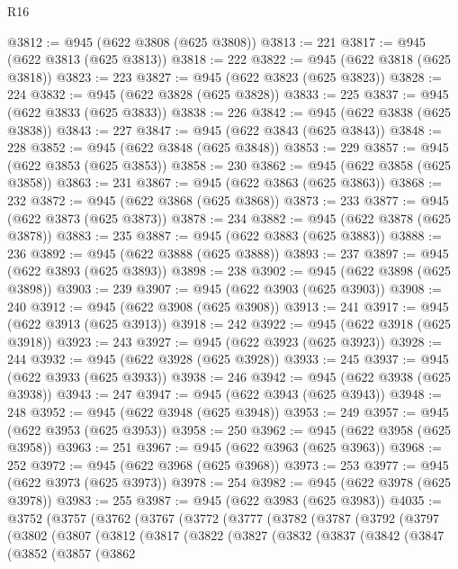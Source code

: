\begin{lexlean}{R16}
\begin{coremodule}
@3812 := @945 (@622 @3808 (@625 @3808))
@3813 := 221
@3817 := @945 (@622 @3813 (@625 @3813))
@3818 := 222
@3822 := @945 (@622 @3818 (@625 @3818))
@3823 := 223
@3827 := @945 (@622 @3823 (@625 @3823))
@3828 := 224
@3832 := @945 (@622 @3828 (@625 @3828))
@3833 := 225
@3837 := @945 (@622 @3833 (@625 @3833))
@3838 := 226
@3842 := @945 (@622 @3838 (@625 @3838))
@3843 := 227
@3847 := @945 (@622 @3843 (@625 @3843))
@3848 := 228
@3852 := @945 (@622 @3848 (@625 @3848))
@3853 := 229
@3857 := @945 (@622 @3853 (@625 @3853))
@3858 := 230
@3862 := @945 (@622 @3858 (@625 @3858))
@3863 := 231
@3867 := @945 (@622 @3863 (@625 @3863))
@3868 := 232
@3872 := @945 (@622 @3868 (@625 @3868))
@3873 := 233
@3877 := @945 (@622 @3873 (@625 @3873))
@3878 := 234
@3882 := @945 (@622 @3878 (@625 @3878))
@3883 := 235
@3887 := @945 (@622 @3883 (@625 @3883))
@3888 := 236
@3892 := @945 (@622 @3888 (@625 @3888))
@3893 := 237
@3897 := @945 (@622 @3893 (@625 @3893))
@3898 := 238
@3902 := @945 (@622 @3898 (@625 @3898))
@3903 := 239
@3907 := @945 (@622 @3903 (@625 @3903))
@3908 := 240
@3912 := @945 (@622 @3908 (@625 @3908))
@3913 := 241
@3917 := @945 (@622 @3913 (@625 @3913))
@3918 := 242
@3922 := @945 (@622 @3918 (@625 @3918))
@3923 := 243
@3927 := @945 (@622 @3923 (@625 @3923))
@3928 := 244
@3932 := @945 (@622 @3928 (@625 @3928))
@3933 := 245
@3937 := @945 (@622 @3933 (@625 @3933))
@3938 := 246
@3942 := @945 (@622 @3938 (@625 @3938))
@3943 := 247
@3947 := @945 (@622 @3943 (@625 @3943))
@3948 := 248
@3952 := @945 (@622 @3948 (@625 @3948))
@3953 := 249
@3957 := @945 (@622 @3953 (@625 @3953))
@3958 := 250
@3962 := @945 (@622 @3958 (@625 @3958))
@3963 := 251
@3967 := @945 (@622 @3963 (@625 @3963))
@3968 := 252
@3972 := @945 (@622 @3968 (@625 @3968))
@3973 := 253
@3977 := @945 (@622 @3973 (@625 @3973))
@3978 := 254
@3982 := @945 (@622 @3978 (@625 @3978))
@3983 := 255
@3987 := @945 (@622 @3983 (@625 @3983))
@4035 := @3752
    (@3757
      (@3762
        (@3767
          (@3772
            (@3777
              (@3782
                (@3787
                  (@3792
                    (@3797
                      (@3802
                        (@3807
                          (@3812
                            (@3817
                              (@3822
                                (@3827
                                  (@3832
                                    (@3837
                                      (@3842
                                        (@3847
                                          (@3852
                                            (@3857
                                              (@3862

\end{coremodule}
\end{lexlean}
